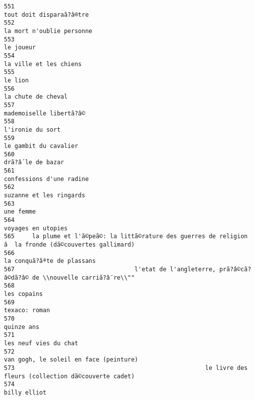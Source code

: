\documentclass[
]{report}
\begin{document}
\begin{verbatim}
551                                                                                tout doit disparaã?â®tre
552                                                                               la mort n'oublie personne
553                                                                                               le joueur
554                                                                                  la ville et les chiens
555                                                                                                 le lion
556                                                                                      la chute de cheval
557                                                                                 mademoiselle libertã?â©
558                                                                                        l'ironie du sort
559                                                                                   le gambit du cavalier
560                                                                                       drã?â´le de bazar
561                                                                                confessions d'une radine
562                                                                                 suzanne et les ringards
563                                                                                               une femme
564                                                                                      voyages en utopies
565     la plume et l'ã©peã©: la littã©rature des guerres de religion ã  la fronde (dã©couvertes gallimard)
566                                                                              la conquã?âªte de plassans
567                                  l'etat de l'angleterre, prã?â©cã?â©dã?â© de \\nouvelle carriã?â¨re\\""
568                                                                                             les copains
569                                                                                           texaco: roman
570                                                                                              quinze ans
571                                                                                   les neuf vies du chat
572                                                                  van gogh, le soleil en face (peinture)
573                                                      le livre des fleurs (collection dã©couverte cadet)
574                                                                                            billy elliot

\end{verbatim}
\end{document}
